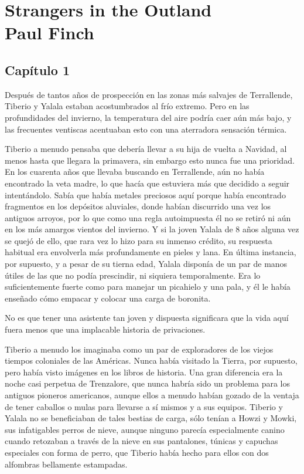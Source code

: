 \part*{Strangers in the Outland \\ \vspace{2 mm} {\large Paul Finch}}

\chapter*{Capítulo 1}

Después de tantos años de prospección en las zonas más salvajes de Terrallende, Tiberio y Yalala estaban acostumbrados al frío extremo. Pero en las profundidades del invierno, la temperatura del aire podría caer aún más bajo, y las frecuentes ventiscas acentuaban esto con una aterradora sensación térmica.
 
Tiberio a menudo pensaba que debería llevar a su hija de vuelta a Navidad, al menos hasta que llegara la primavera, sin embargo esto nunca fue una prioridad. En los cuarenta años que llevaba buscando en Terrallende, aún no había encontrado la veta madre, lo que hacía que estuviera más que decidido a seguir intentándolo. Sabía que había metales preciosos aquí porque había encontrado fragmentos en los depósitos aluviales, donde habían discurrido una vez los antiguos arroyos, por lo que como una regla autoimpuesta él no se retiró ni aún en los más amargos vientos del invierno. Y si la joven Yalala de 8 años alguna vez se quejó de ello, que rara vez lo hizo para su inmenso crédito, su respuesta habitual era envolverla más profundamente en pieles y lana. En última instancia, por supuesto, y a pesar de su tierna edad, Yalala disponía de un par de manos útiles de las que no podía prescindir, ni siquiera temporalmente. Era lo suficientemente fuerte como para manejar un picahielo y una pala, y él le había enseñado cómo empacar y colocar una carga de boronita.
 
No es que tener una asistente tan joven y dispuesta significara que la vida aquí fuera menos que una implacable historia de privaciones.
 
Tiberio a menudo los imaginaba como un par de exploradores de los viejos tiempos coloniales de las Américas. Nunca había visitado la Tierra, por supuesto, pero había visto imágenes en los libros de historia. Una gran diferencia era la noche casi perpetua de Trenzalore, que nunca habría sido un problema para los antiguos pioneros americanos, aunque ellos a menudo habían gozado de la ventaja de tener caballos o mulas para llevarse a sí mismos y a sus equipos. Tiberio y Yalala no se beneficiaban de tales bestias de carga, sólo tenían a Howzi y Mowki, sus infatigables perros de nieve, aunque ninguno parecía especialmente canino cuando retozaban a través de la nieve en sus pantalones, túnicas y capuchas especiales con forma de perro, que Tiberio había hecho para ellos con dos alfombras bellamente estampadas.
 
